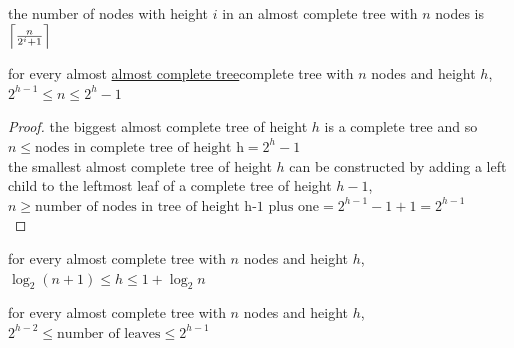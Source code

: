\documentclass[a4paper,12pt]{article}
\DeclarePairedDelimiter\ceil{\lceil}{\rceil}
\begin{document}
\begin{lemma}
the number of nodes with height \(i\) in an almost complete tree with \(n\) nodes is \(\ceil*{\frac{n}{2^i+1}}\)\\[0pt]
\end{lemma}

\begin{lemma}
for every almost \hyperref[sec:orgcd32ba8]{almost complete tree}complete tree with \(n\) nodes and height \(h\), \(2^{h-1} \leq n \leq 2^h-1\)\\[0pt]
\begin{proof}
the biggest almost complete tree of height \(h\) is a complete tree and so \(n \leq \text{nodes in complete tree of height h} = 2^h-1\)\\[0pt]
the smallest almost complete tree of height \(h\) can be constructed by adding a left child to the leftmost leaf of a complete tree of height \(h-1\), \(n \geq \text{number of nodes in tree of height h-1 plus one} = 2^{h-1}-1+1=2^{h-1}\)\\[0pt]
\end{proof}
\end{lemma}

\begin{lemma}
for every almost complete tree with \(n\) nodes and height \(h\), \(\log_2(n+1) \leq h \leq 1+\log_2{n}\)\\[0pt]
\end{lemma}

\begin{lemma}
for every almost complete tree with \(n\) nodes and height \(h\), \(2^{h-2} \leq \text{number of leaves} \leq 2^{h-1}\)\\[0pt]
\end{lemma}
\end{document}
